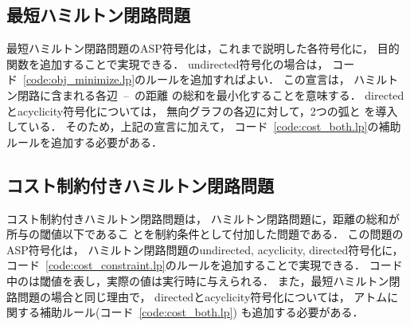 \subsection{最短ハミルトン閉路問題}\label{minexpl}




最短ハミルトン閉路問題のASP符号化は，これまで説明した各符号化に，
目的関数を追加することで実現できる．
\textsf{undirected}符号化の場合は，
コード~\ref{code:obj_minimize.lp}のルールを追加すればよい．
%
この宣言は，
ハミルトン閉路に含まれる各辺~--~の距離
の総和を最小化することを意味する．
%
\textsf{directed}と\textsf{acyclicity}符号化については，
無向グラフの各辺に対して，2つの弧と
を導入している．
そのため，上記の宣言に加えて，
コード~\ref{code:cost_both.lp}の補助ルールを追加する必要がある．

\subsection{コスト制約付きハミルトン閉路問題}



コスト制約付きハミルトン閉路問題は，
ハミルトン閉路問題に，距離の総和が所与の閾値以下であるこ
とを制約条件として付加した問題である．
この問題のASP符号化は，
ハミルトン閉路問題の\textsf{undirected}, \textsf{acyclicity},
\textsf{directed}符号化に，
コード~\ref{code:cost_constraint.lp}のルールを追加することで実現できる．
%
コード中のは閾値を表し，実際の値は実行時に与えられる．
また，最短ハミルトン閉路問題の場合と同じ理由で，
\textsf{directed}と\textsf{acyclicity}符号化については，
アトムに関する補助ルール(コード~\ref{code:cost_both.lp})
も追加する必要がある．

